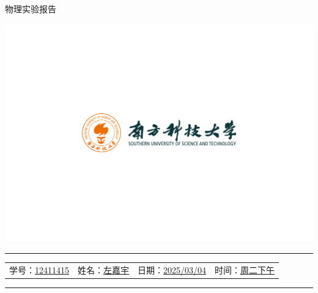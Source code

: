 \documentclass[12pt,a4paper]{article}
\begin{document}
	\noindent
	\hspace{-2em}
	\begin{minipage}[c]{0.65\textwidth}
		\raggedright
		{\fontsize{40pt}{60pt}\selectfont 物理实验报告}
	\end{minipage}
	\begin{minipage}[c]{0.35\textwidth}
		\raggedleft
		\includegraphics[width=\linewidth, trim={20cm 20cm 20cm 20cm}, clip]{university_logo.png}
	\end{minipage}

	\vspace{-1em}
	

	
	\hrule
	\vspace{0.4em}
	\noindent
	\begin{tabular}{l l l l}
    学号：\underline{12411415} & 姓名：\underline{左嘉宇} &
    日期：\underline{2025/03/04} & 时间：\underline{周二下午}
	\end{tabular}
	\vspace{-0em}
	\par
	\hrule

	

\end{document}
